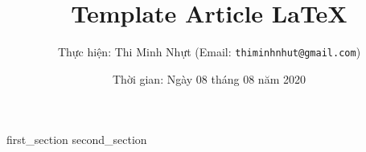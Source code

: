 \documentclass[12pt,a4paper]{article}
\title{\bfseries Template Article \LaTeX}
\author{Thực hiện: Thi Minh Nhựt (Email: \texttt{thiminhnhut@gmail.com})}
\date{Thời gian: Ngày 08 tháng 08 năm 2020}
\begin{document}
\maketitle

\tableofcontents

{first_section}
{second_section}
\end{document}
